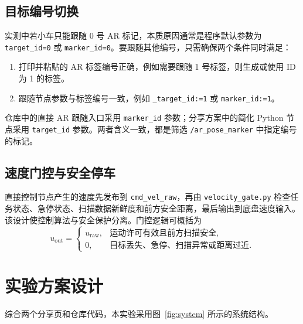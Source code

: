\documentclass[UTF8,a4paper,12pt]{ctexart}
\begin{document}
	\subsection{目标编号切换}
	实测中若小车只能跟随 0 号 AR 标记，本质原因通常是程序默认参数为 \texttt{target\_id=0} 或 \texttt{marker\_id=0}。要跟随其他编号，只需确保两个条件同时满足：
	\begin{enumerate}
		\item 打印并粘贴的 AR 标签编号正确，例如需要跟随 1 号标签，则生成或使用 ID 为 1 的标签。
		\item 跟随节点参数与标签编号一致，例如 \texttt{\_target\_id:=1} 或 \texttt{marker\_id:=1}。
	\end{enumerate}
	仓库中的直接 AR 跟随入口采用 \texttt{marker\_id} 参数；分享方案中的简化 Python 节点采用 \texttt{target\_id} 参数。两者含义一致，都是筛选 \texttt{/ar\_pose\_marker} 中指定编号的标记。

	\subsection{速度门控与安全停车}
	直接控制节点产生的速度先发布到 \texttt{cmd\_vel\_raw}，再由 \texttt{velocity\_gate.py} 检查任务状态、急停状态、扫描数据新鲜度和前方安全距离，最后输出到底盘速度输入。该设计使控制算法与安全保护分离。门控逻辑可概括为
	\begin{equation}
		u_{\mathrm{out}}=
		\begin{cases}
			u_{\mathrm{raw}}, & \text{运动许可有效且前方扫描安全},\\
			0, & \text{目标丢失、急停、扫描异常或距离过近}.
		\end{cases}
	\end{equation}

	\section{实验方案设计}
	综合两个分享页和仓库代码，本实验采用图~\ref{fig:system} 所示的系统结构。
\end{document}

